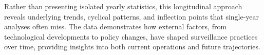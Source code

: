\documentclass[11pt]{article}
\begin{document}
Rather than presenting isolated yearly statistics, this longitudinal approach reveals underlying trends, cyclical patterns, and inflection points that single-year analyses often miss. The data demonstrates how external factors, from technological developments to policy changes, have shaped surveillance practices over time, providing insights into both current operations and future trajectories.
\end{document}
